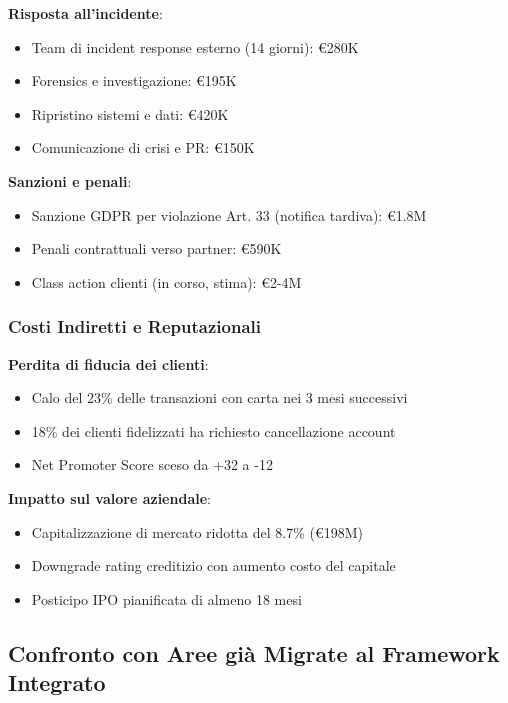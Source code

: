 \textbf{Risposta all'incidente}:
\begin{itemize}
    \item Team di incident response esterno (14 giorni): €280K
    \item Forensics e investigazione: €195K
    \item Ripristino sistemi e dati: €420K
    \item Comunicazione di crisi e PR: €150K
\end{itemize}

\textbf{Sanzioni e penali}:
\begin{itemize}
    \item Sanzione GDPR per violazione Art. 33 (notifica tardiva): €1.8M
    \item Penali contrattuali verso partner: €590K
    \item Class action clienti (in corso, stima): €2-4M
\end{itemize}

\subsubsection{\texorpdfstring{Costi Indiretti e Reputazionali}{4.8.2.2 - Costi Indiretti e Reputazionali}}

\textbf{Perdita di fiducia dei clienti}:
\begin{itemize}
    \item Calo del 23\% delle transazioni con carta nei 3 mesi successivi
    \item 18\% dei clienti fidelizzati ha richiesto cancellazione account
    \item Net Promoter Score sceso da +32 a -12
\end{itemize}

\textbf{Impatto sul valore aziendale}:
\begin{itemize}
    \item Capitalizzazione di mercato ridotta del 8.7\% (€198M)
    \item Downgrade rating creditizio con aumento costo del capitale
    \item Posticipo IPO pianificata di almeno 18 mesi
\end{itemize}

\subsection{\texorpdfstring{Confronto con Aree già Migrate al Framework Integrato}{4.8.3 - Confronto con Aree già Migrate al Framework Integrato}}
\label{subsec:4.8.3_confronto}

